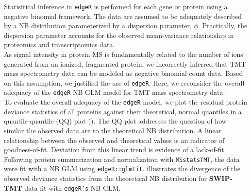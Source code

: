 \documentclass[12pt]{elife}\usepackage[]{graphicx}\usepackage[]{color}
\begin{document}
Statisitical inference in \texttt{edgeR} is performed for each gene or protein 
using a negative binomial framework. The data are assumed to 
be adequately described by a NB distribution parameterized by a dispersion 
parameter, $\phi$. Practically, the dispersion parameter accounts for the
observed mean-variance relationship in proteomics and transcriptomics data.\\

As signal intensity in protein MS is fundamentally related to the
number of ions generated from an ionized, fragmented protein, we incorrectly
inferred that TMT mass spectrometry data can be modeled as negative binomial
count data. Based on this assumption, we justified the use of \texttt{edgeR}.
Here, we reconsider the overall adequacy of the \texttt{edgeR} NB GLM model for
TMT mass spectrometry data.\\

To evaluate the overall adequacy of the \texttt{edgeR} model, we plot the
residual protein deviance statistics of all proteins against their theoretical,
normal quantiles in a quantile-quantile (QQ) plot ().  The QQ plot
addresses the question of how similar the observed data are to the theoretical
NB distribution.  A linear relationship between the observed and theoretical
values is an indicator of goodness-of-fit.  Deviation from this linear trend is
evidence of a lack-of-fit.\\

Following protein summarization and normalization with \texttt{MSstatsTMT}, the
data were fit with a NB GLM using \texttt{edgeR::glmFit}.  illustrates
the divergence of the observed deviance statistics from the theoretical NB
distribution for \textbf{SWIP-TMT} data fit with \texttt{edgeR's} NB GLM.\\
\end{document}

